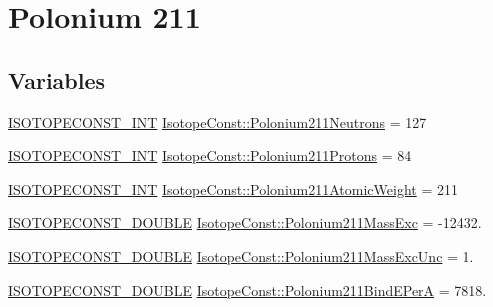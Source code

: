 \hypertarget{group___isotope_const-_polonium-_po211}{}\section{Polonium 211}
\label{group___isotope_const-_polonium-_po211}
\subsection*{Variables}
\begin{DoxyCompactItemize}
\item 
\mbox{\hyperlink{group___isotope_const-_macros_ga5f18360b3e99483a35c32d789e62621c}{I\+S\+O\+T\+O\+P\+E\+C\+O\+N\+S\+T\+\_\+\+I\+NT}} \mbox{\hyperlink{group___isotope_const-_polonium-_po211_ga00618eea255de848f42d679a465c0b39}{Isotope\+Const\+::\+Polonium211\+Neutrons}} = 127
\item 
\mbox{\hyperlink{group___isotope_const-_macros_ga5f18360b3e99483a35c32d789e62621c}{I\+S\+O\+T\+O\+P\+E\+C\+O\+N\+S\+T\+\_\+\+I\+NT}} \mbox{\hyperlink{group___isotope_const-_polonium-_po211_gaa48a52725afc70d3381e64a88a63c3af}{Isotope\+Const\+::\+Polonium211\+Protons}} = 84
\item 
\mbox{\hyperlink{group___isotope_const-_macros_ga5f18360b3e99483a35c32d789e62621c}{I\+S\+O\+T\+O\+P\+E\+C\+O\+N\+S\+T\+\_\+\+I\+NT}} \mbox{\hyperlink{group___isotope_const-_polonium-_po211_gab8a205aaca71ec201f1cdd215d40de18}{Isotope\+Const\+::\+Polonium211\+Atomic\+Weight}} = 211
\item 
\mbox{\hyperlink{group___isotope_const-_macros_ga8f45a7272ce02c0b4c65c44636ed719a}{I\+S\+O\+T\+O\+P\+E\+C\+O\+N\+S\+T\+\_\+\+D\+O\+U\+B\+LE}} \mbox{\hyperlink{group___isotope_const-_polonium-_po211_ga17c186f52acfe18986c7e1e7f4172ca5}{Isotope\+Const\+::\+Polonium211\+Mass\+Exc}} = -\/12432.
\item 
\mbox{\hyperlink{group___isotope_const-_macros_ga8f45a7272ce02c0b4c65c44636ed719a}{I\+S\+O\+T\+O\+P\+E\+C\+O\+N\+S\+T\+\_\+\+D\+O\+U\+B\+LE}} \mbox{\hyperlink{group___isotope_const-_polonium-_po211_ga189e056204effe5318908b23b29dc7c3}{Isotope\+Const\+::\+Polonium211\+Mass\+Exc\+Unc}} = 1.
\item 
\mbox{\hyperlink{group___isotope_const-_macros_ga8f45a7272ce02c0b4c65c44636ed719a}{I\+S\+O\+T\+O\+P\+E\+C\+O\+N\+S\+T\+\_\+\+D\+O\+U\+B\+LE}} \mbox{\hyperlink{group___isotope_const-_polonium-_po211_ga2560e2a6fec21dc55f43b821edeeba1f}{Isotope\+Const\+::\+Polonium211\+Bind\+E\+PerA}} = 7818.
\item 

\end{DoxyCompactItemize}
